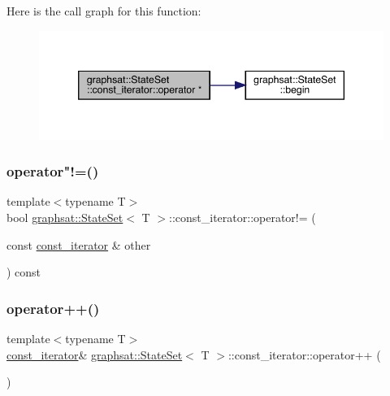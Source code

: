 Here is the call graph for this function\+:
\nopagebreak
\begin{figure}[H]
\begin{center}
\leavevmode
\includegraphics[width=346pt]{classgraphsat_1_1_state_set_1_1const__iterator_a41aad9be6b5c0347976b271f4863edb1_cgraph}
\end{center}
\end{figure}
\mbox{\label{classgraphsat_1_1_state_set_1_1const__iterator_a429d2b7fa1741bd7434a06087aae8b47}} 
\subsubsection{\texorpdfstring{operator"!=()}{operator!=()}}
{\footnotesize\ttfamily template$<$typename T$>$ \\
bool \mbox{\hyperlink{classgraphsat_1_1_state_set}{graphsat\+::\+State\+Set}}$<$ T $>$\+::const\+\_\+iterator\+::operator!= (\begin{DoxyParamCaption}\item[{const \mbox{\hyperlink{classgraphsat_1_1_state_set_1_1const__iterator}{const\+\_\+iterator}} \&}]{other }\end{DoxyParamCaption}) const\hspace{0.3cm}{\ttfamily [inline]}}

\mbox{\label{classgraphsat_1_1_state_set_1_1const__iterator_aebd760173617e51a4b4831140c43001c}} 
\subsubsection{\texorpdfstring{operator++()}{operator++()}}
{\footnotesize\ttfamily template$<$typename T$>$ \\
\mbox{\hyperlink{classgraphsat_1_1_state_set_1_1const__iterator}{const\+\_\+iterator}}\& \mbox{\hyperlink{classgraphsat_1_1_state_set}{graphsat\+::\+State\+Set}}$<$ T $>$\+::const\+\_\+iterator\+::operator++ (\begin{DoxyParamCaption}{ }\end{DoxyParamCaption})\hspace{0.3cm}{\ttfamily [inline]}}

